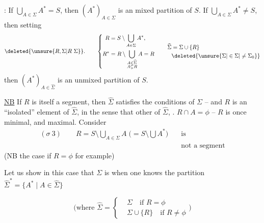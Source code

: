 \uline{}: If $\bigcup_{A\in\Sigma}A^*=S$, then  $(A^*)_{A\in\Sigma}$ is an  mixed partition of $S$. If $\bigcup_{A\in\Sigma}A^*\ne S$, then setting
\[
 \deleted{\unsure{R,\Sigma|R\ \Sigma}}\mathpunct{.}\qquad
 \left\{\begin{aligned}
 R&=S\setminus\bigcup_{A\in\Sigma}A^*,\\
 R^*&=R\setminus\bigcup_{\substack{A\in\widehat\Sigma\\ A\subsetneq R}}A=R
 \end{aligned}\right.\qquad
 \begin{aligned}
 \widehat\Sigma&=\Sigma\cup\{R\}\\
 &\deleted{\unsure{\Sigma|\in\Sigma|\ne\Sigma_0}}
 \end{aligned}
\]
then $(A^*)_{A\in\widehat\Sigma}$ is an unmixed partition of $S$.

\uline{NB} If $R$ is itself a segment, then  $\widehat\Sigma$ satisfies the conditions of $\Sigma$ -- and $R$ is an  ``isolated'' element of $\widehat\Sigma$, in the sense that   other   of $\widehat\Sigma$, . $R\cap A=\phi$ --   $R$ is  once minimal, and maximal. Consider
\[
 \begin{aligned}
 (\sigma\ 3)\qquad R=S\setminus\bigcup_{A\in\Sigma}A\;
 \bigl(=S\setminus\bigcup A^*\bigr)&\quad\text{is}\\
 &\quad\text{not a segment}
 \end{aligned}
\]
(NB  the case if $R=\phi$ for example)

Let us show in this case that  $\Sigma$ is   when one knows the partition $\widehat\Sigma^*=\{A^*\mid A\in\widehat\Sigma\}$

\[
 \bigl(\text{where }\widehat\Sigma=\left\{\begin{aligned}
 &\Sigma\quad\text{if }R=\phi\\
 &\Sigma\cup\{R\}\quad\text{if }R\ne\phi
 \end{aligned}\right.\bigr)
\]
